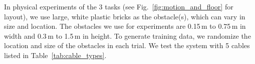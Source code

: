 

In physical experiments of the 3 tasks (see Fig.~\ref{fig:motion_and_floor} for layout),
% 
we use large, white plastic bricks as the obstacle(s), which can vary in size and location. The obstacles we use for experiments are 0.15\,m to 0.75\,m in width and 0.3\,m to 1.5\,m in height.
To generate training data, we randomize the location and size of the obstacles in each trial.
We test the system with 5 cables listed in Table~\ref{tab:cable_types}.




